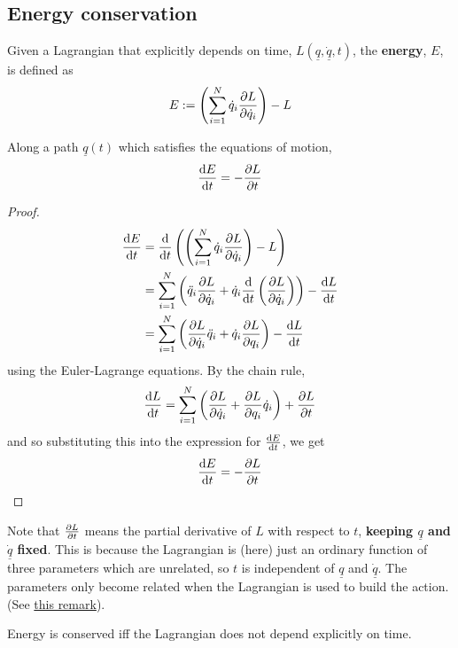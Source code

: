 \subsection{Energy conservation}

\begin{definition}
	Given a Lagrangian that explicitly depends on time, $L(\underline{q}, \underline{\dot{q}}, t)$, the \textbf{energy}, $E$, is defined as
	\[
		E := \left( \sum_{i = 1}^{N} \dot{q}_i \diffp{L}{\dot{q}_i} \right) - L
	\]
\end{definition}

\begin{theorem}
	Along a path $\underline{q}(t)$ which satisfies the equations of motion,
	\[
		\diff{E}{t} = -\diffp{L}{t}
	\]
\end{theorem}

\begin{proof}
	\[
		\begin{aligned}
			\diff{E}{t}
				& = \diff{}{t} \left( \left( \sum_{i = 1}^{N} \dot{q}_i \diffp{L}{\dot{q}_i} \right) - L \right) \\
				& = \sum_{i = 1}^{N} \left( \ddot{q}_i \diffp{L}{\dot{q}_i} + \dot{q}_i \diff{}{t} \left( \diffp{L}{\dot{q}_i} \right) \right) - \diff{L}{t} \\
				& = \sum_{i = 1}^{N} \left( \diffp{L}{\dot{q}_i} \ddot{q}_i + \dot{q}_i \diffp{L}{q_i} \right) - \diff{L}{t}
		\end{aligned}
	\]
	using the Euler-Lagrange equations. By the chain rule,
	\[
		\diff{L}{t} = \sum_{i = 1}^{N} \left( \diffp{L}{\dot{q}_i} + \diffp{L}{q_i} \dot{q}_i \right) + \diffp{L}{t}
	\]
	and so substituting this into the expression for $\diff{E}{t}$, we get
	\[
		\diff{E}{t} = -\diffp{L}{t}
	\]
\end{proof}

\begin{remark}
	Note that $\diffp{L}{t}$ means the partial derivative of $L$ with respect to $t$, \textbf{keeping $\underline{q}$ and $\underline{\dot{q}}$ fixed}. This is because the Lagrangian is (here) just an ordinary function of three parameters which are unrelated, so $t$ is independent of $\underline{q}$ and $\underline{\dot{q}}$. The parameters only become related when the Lagrangian is used to build the action. (See \hyperref[rem:lagrangianParametersIndependent]{this remark}).
\end{remark}

\begin{corollary}
	Energy is conserved iff the Lagrangian does not depend explicitly on time.
\end{corollary}

